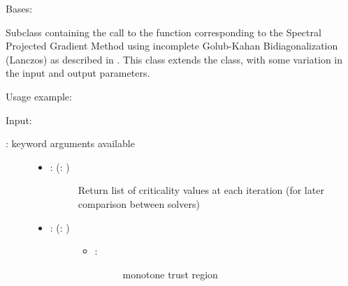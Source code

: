 \documentclass[a4paper,10pt,english]{sphinxmanual}
\begin{document}

\begin{fulllineitems}
\label{\detokenize{skprocrustes:skprocrustes.GKBSolver}}
Bases: 

Subclass containing the call to the  function 
corresponding to the Spectral Projected Gradient Method using 
incomplete Golub-Kahan Bidiagonalization (Lanczos) as described in 
\label{\detokenize{skprocrustes:id7}}{\hyperref[\detokenize{skprocrustes:franbazawebe17}]{\sphinxcrossref{{[}FBM17{]}}}}. This class extends the  class,
with some variation in the input and output parameters.

Usage example:

\begin{sphinxVerbatim}[commandchars=\\\{\}]
  
  
\end{sphinxVerbatim}

Input:
\begin{description}
\item[{: keyword arguments available}] \leavevmode\begin{itemize}
\item {} \begin{description}
\item[{: (: )}] \leavevmode
Return list of criticality values at each iteration (for later
comparison between solvers)

\end{description}

\item {} \begin{description}
\item[{: (: )}] \leavevmode\begin{itemize}
\item {} \begin{description}
\item[{: }] \leavevmode
monotone trust region


\end{description}
\end{itemize}
\end{description}
\end{itemize}
\end{description}
\end{fulllineitems}
\end{document}
